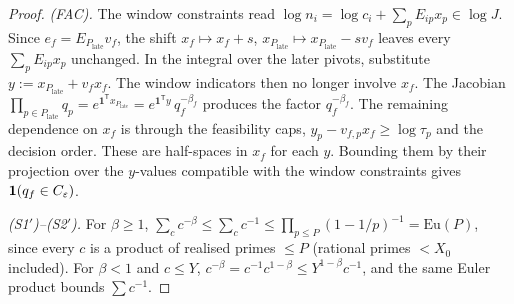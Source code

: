 \begin{proof}
\emph{(FAC).} The window constraints read $\log n_i=\log c_i+\sum_{p}E_{ip}x_p\in\log J$. Since
$e_f=E_{P_{\mathrm{late}}}v_f$, the shift $x_f\mapsto x_f+s$, $x_{P_{\mathrm{late}}}\mapsto x_{P_{\mathrm{late}}}-sv_f$
leaves every $\sum_pE_{ip}x_p$ unchanged. In the integral over the later pivots, substitute
$y:=x_{P_{\mathrm{late}}}+v_fx_f$. The window indicators then no longer involve $x_f$. The Jacobian
$\prod_{p\in P_{\mathrm{late}}}q_p=e^{\mathbf 1^{\mathsf T}x_{P_{\mathrm{late}}}}=e^{\mathbf 1^{\mathsf T}y}\,q_f^{-\beta_f}$
produces the factor $q_f^{-\beta_f}$. The remaining dependence on $x_f$ is through the feasibility caps,
$y_p-v_{f,p}x_f\ge\log\tau_p$ and the decision order. These are half-spaces in $x_f$ for each $y$. Bounding them by their
projection over the $y$-values compatible with the window constraints gives $\mathbf 1(q_f\in C_\varepsilon)$.

\emph{(S1$'$)--(S2$'$).} For $\beta\ge1$, $\sum_cc^{-\beta}\le\sum_cc^{-1}\le\prod_{p\le P}(1-1/p)^{-1}=\mathrm{Eu}(P)$,
since every $c$ is a product of realised primes $\le P$ (rational primes $<X_0$ included). For $\beta<1$ and $c\le Y$,
$c^{-\beta}=c^{-1}c^{1-\beta}\le Y^{1-\beta}c^{-1}$, and the same Euler product bounds $\sum c^{-1}$.


\end{proof}
